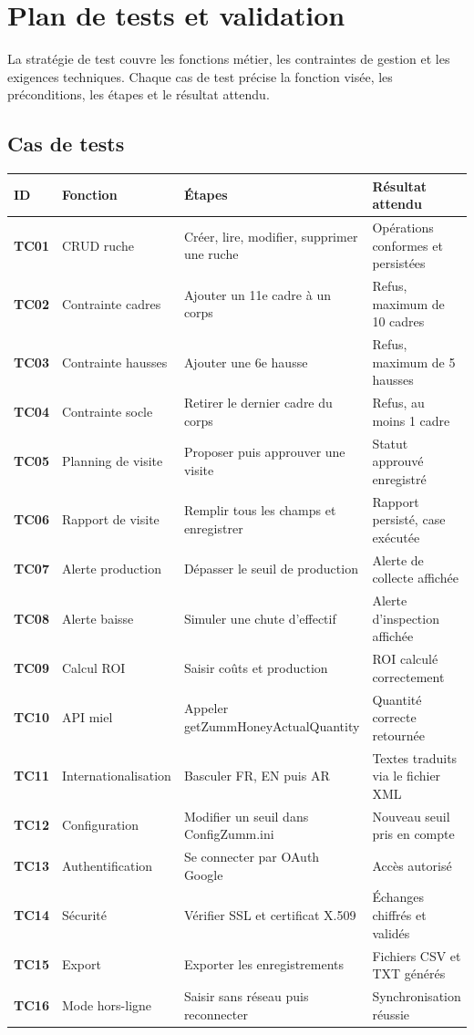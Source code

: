 \chapter{Plan de tests et validation}
\label{chap:tests}
La stratégie de test couvre les fonctions métier, les contraintes de gestion et
les exigences techniques. Chaque cas de test précise la fonction visée, les
préconditions, les étapes et le résultat attendu.

\section{Cas de tests}
\begin{xltabular}{\textwidth}{>{\bfseries}p{1.4cm} p{3.6cm} p{4.2cm} X}
\toprule
\textbf{ID} & \textbf{Fonction} & \textbf{Étapes} & \textbf{Résultat attendu} \\
\midrule
\endhead
TC01 & CRUD ruche & Créer, lire, modifier, supprimer une ruche & Opérations conformes et persistées \\
TC02 & Contrainte cadres & Ajouter un 11e cadre à un corps & Refus, maximum de 10 cadres \\
TC03 & Contrainte hausses & Ajouter une 6e hausse & Refus, maximum de 5 hausses \\
TC04 & Contrainte socle & Retirer le dernier cadre du corps & Refus, au moins 1 cadre \\
TC05 & Planning de visite & Proposer puis approuver une visite & Statut approuvé enregistré \\
TC06 & Rapport de visite & Remplir tous les champs et enregistrer & Rapport persisté, case exécutée \\
TC07 & Alerte production & Dépasser le seuil de production & Alerte de collecte affichée \\
TC08 & Alerte baisse & Simuler une chute d'effectif & Alerte d'inspection affichée \\
TC09 & Calcul ROI & Saisir coûts et production & ROI calculé correctement \\
TC10 & API miel & Appeler getZummHoneyActualQuantity & Quantité correcte retournée \\
TC11 & Internationalisation & Basculer FR, EN puis AR & Textes traduits via le fichier XML \\
TC12 & Configuration & Modifier un seuil dans ConfigZumm.ini & Nouveau seuil pris en compte \\
TC13 & Authentification & Se connecter par OAuth Google & Accès autorisé \\
TC14 & Sécurité & Vérifier SSL et certificat X.509 & Échanges chiffrés et validés \\
TC15 & Export & Exporter les enregistrements & Fichiers CSV et TXT générés \\
TC16 & Mode hors-ligne & Saisir sans réseau puis reconnecter & Synchronisation réussie \\
\bottomrule
\end{xltabular}

